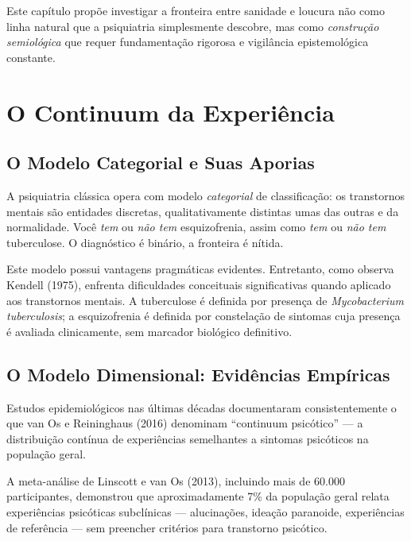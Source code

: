 Este capítulo propõe investigar a fronteira entre sanidade e loucura não como linha natural que a psiquiatria simplesmente descobre, mas como \textit{construção semiológica} que requer fundamentação rigorosa e vigilância epistemológica constante.

\section{O Continuum da Experiência}
\label{sec:continuum}

\subsection{O Modelo Categorial e Suas Aporias}

A psiquiatria clássica opera com modelo \textit{categorial} de classificação: os transtornos mentais são entidades discretas, qualitativamente distintas umas das outras e da normalidade. Você \textit{tem} ou \textit{não tem} esquizofrenia, assim como \textit{tem} ou \textit{não tem} tuberculose. O diagnóstico é binário, a fronteira é nítida.

Este modelo possui vantagens pragmáticas evidentes. Entretanto, como observa Kendell (1975), enfrenta dificuldades conceituais significativas quando aplicado aos transtornos mentais. A tuberculose é definida por presença de \textit{Mycobacterium tuberculosis}; a esquizofrenia é definida por constelação de sintomas cuja presença é avaliada clinicamente, sem marcador biológico definitivo.

\subsection{O Modelo Dimensional: Evidências Empíricas}

Estudos epidemiológicos nas últimas décadas documentaram consistentemente o que van Os e Reininghaus (2016) denominam \enquote{continuum psicótico} --- a distribuição contínua de experiências semelhantes a sintomas psicóticos na população geral.

A meta-análise de Linscott e van Os (2013), incluindo mais de 60.000 participantes, demonstrou que aproximadamente 7\% da população geral relata experiências psicóticas subclínicas --- alucinações, ideação paranoide, experiências de referência --- sem preencher critérios para transtorno psicótico.

